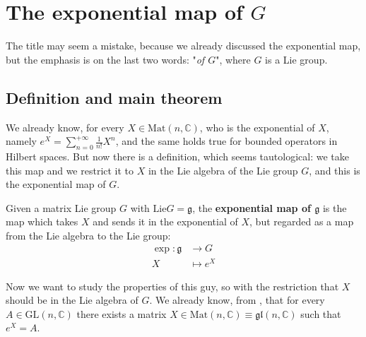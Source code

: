 \documentclass[../main.tex]{subfiles}
\begin{document}
\setchapterpreamble[u]{\margintoc}
\chapter[The exponential map of $G$]{The exponential map of $G$\footnotemark[0]}
The title may seem a mistake, because we already discussed the exponential map, but the emphasis is on the last two words: "\textit{of $G$}", where $G$ is a Lie group. 
\section{Definition and main theorem}
We already know, for every $X\in\textrm{Mat}(n,\mathbb{C})$, who is the exponential of $X$, namely $e^X=\sum_{n=0}^{+\infty}\frac{1}{n!}X^n$, and the same holds true for bounded operators in Hilbert spaces. But now there is a definition, which seems tautological: we take this map and we restrict it to $X$ in the Lie algebra of the Lie group $G$, and this is the exponential map of $G$.
\begin{definition}
Given a matrix Lie group $G$ with $\textrm{Lie}G=\mathfrak{g}$, the \textbf{exponential map of $\mathfrak{g}$} is the map which takes $X$ and sends it in the exponential of $X$, but regarded as a map from the Lie algebra to the Lie group:
\[
\begin{split}
    \exp:\mathfrak{g}&\to G\\
    X&\mapsto e^{X}
\end{split}
\]
\end{definition}
Now we want to study the properties of this guy, so with the restriction that $X$ should be in the Lie algebra of $G$. We already know, from , that for every $A\in\textrm{GL}(n,\mathbb{C})$ there exists a matrix $X\in\textrm{Mat}(n,\mathbb{C})\equiv\mathfrak{gl}(n,\mathbb{C})$ such that {\color{red}$e^{X}=A$}.
\end{document}
